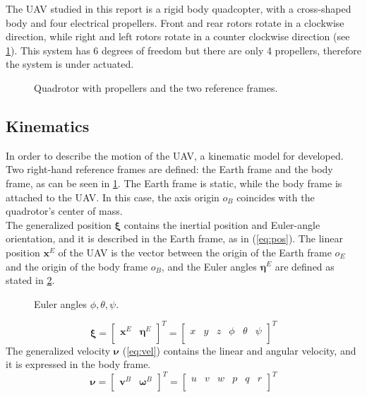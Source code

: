 \documentclass[journal]{IEEEtran}
\begin{document}
	 The UAV studied in this report is a rigid body quadcopter, with a cross-shaped body and four electrical propellers. Front and rear rotors rotate in a clockwise direction, while right and left rotors rotate in a counter clockwise direction (see \figurename  \ref{fig:frames_rotors}). This system has 6 degrees of freedom but there are only 4 propellers, therefore the system is under actuated. 
	
	\begin{figure}[H]
		\centering
		
		\caption{Quadrotor with propellers and the two reference frames.}
		\label{fig:frames_rotors}
	\end{figure}
	
	\subsection{Kinematics}
	In order to describe the motion of the UAV, a kinematic model for  developed. Two right-hand reference frames are defined: the Earth frame and the body frame, as can be seen in \figurename{ {}\ref{fig:frames_rotors}}. The Earth frame is static, while the body frame is attached to the UAV. In this case, the axis origin $o_B$ coincides with the quadrotor's center of mass.\\

	The generalized position $\bm{\xi}$ contains the inertial position and Euler-angle orientation, and it is described in the Earth frame, as in (\ref{eq:pos}). The linear position $\bm{x}^E$ of the UAV is the vector between the origin of the Earth frame $o_E$ and the origin of the body frame $o_B$, and the Euler angles $\bm{\eta}^E$ are defined as stated in \figurename{ \ref{fig:roll_pitch_yaw}}.
	
	\begin{figure}[h]
		\centering
		
		
		
		\caption{Euler angles $\phi, \theta, \psi$.}
		\label{fig:roll_pitch_yaw}
	\end{figure}

	\begin{equation} \label{eq:pos}
	\bm{\xi} = \left[ \begin{array}{cc}
	\bm{x}^E & \bm{\eta}^E \\
	\end{array}\right]^T = \left[ \begin{array}{cccccc}
	x & y & z & \phi & \theta & \psi\\
	\end{array}\right] ^T
	\end{equation}  
	The generalized velocity $\bm{\nu}$ (\ref{eq:vel}) contains the linear and angular velocity, and it is expressed in the body frame.
	\begin{equation} \label{eq:vel}
	\bm{\nu} = \left[ \begin{array}{cc}
	\bm{v}^B & \bm{\omega}^B \\
	\end{array}\right]^T = \left[ \begin{array}{cccccc}
	u & v & w & p & q & r\\
	\end{array}\right] ^T 
	\end{equation}
	
\end{document}
